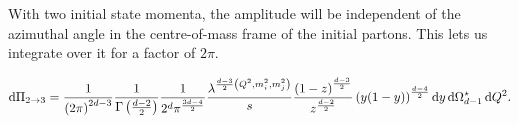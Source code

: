 \documentclass[../main.tex]{subfiles}
\begin{document}
With two initial state momenta, the amplitude will be independent of the
azimuthal angle in the centre-of-mass frame of the initial partons. This lets
us integrate over it for a factor of \(2\pi\).

\begin{equation}
  \mathrm{d}\Pi_{2\to 3} = \frac{1}{\left(2\pi\right)^{2d-3}}
  \frac{1}{\Gamma\left(\frac{d-2}{2}\right)}
  \frac{1}{2^d\pi^{\frac{3d-4}{2}}}
  \frac{\lambda^{\frac{d-3}{2}\left(Q^2,m_i^2,m_j^2\right)}}{s}
  \frac{\left(1-z\right)^{\frac{d-3}{2}}}{z^{\frac{d-2}{2}}}
  \left(y(1-y)\right)^{\frac{d-4}{2}} \mathrm{d}y\,
  \mathrm{d}\Omega_{d-1}^\star\,
  \mathrm{d}Q^2.
\end{equation}

\end{document}
